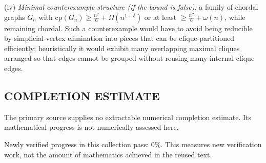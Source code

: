(iv) \emph{Minimal counterexample structure (if the bound is false):} a family of chordal graphs $G_n$ with $\mathrm{cp}(G_n)\ge \frac{n^2}{6}+\Omega(n^{1+\delta})$ or at least $\ge \frac{n^2}{6}+\omega(n)$, while remaining chordal. Such a counterexample would have to avoid being reducible by simplicial-vertex elimination into pieces that can be clique-partitioned efficiently; heuristically it would exhibit many overlapping maximal cliques arranged so that edges cannot be grouped without reusing many internal clique edges.




\subsection*{COMPLETION ESTIMATE}
The primary source supplies no extractable numerical completion estimate. Its mathematical progress is not numerically assessed here.

Newly verified progress in this collection pass: $0\%$. This measures new verification work, not the amount of mathematics achieved in the reused text.
